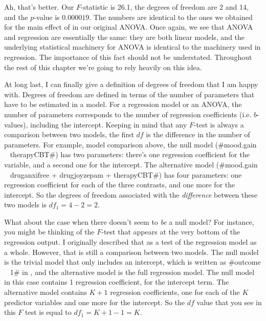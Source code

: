 Ah, that's better. Our $F$-statistic is 26.1, the degrees of freedom are 2 and 14, and the $p$-value is $0.000019$. The numbers are identical to the ones we obtained for the main effect of  in our original ANOVA. Once again, we see that ANOVA and regression are essentially the same: they are both linear models, and the underlying statistical machinery for ANOVA is identical to the machinery used in regression. The importance of this fact should not be understated. Throughout the rest of this chapter we're going to rely heavily on this idea.  



At long last, I can finally give a definition of degrees of freedom that I am happy with. Degrees of freedom are defined in terms of the number of parameters that have to be estimated in a model. For a regression model or an ANOVA, the number of parameters corresponds to the number of regression coefficients (i.e. $b$-values), including the intercept. Keeping in mind that any $F$-test is always a comparison between two models, the first $df$ is the difference in the number of parameters. For example, model comparison above, the null model (\rtextverb#mood.gain ~ therapyCBT#) has two parameters: there's one regression coefficient for the  variable, and a second one for the intercept. The  alternative model (\rtextverb#mood.gain ~ druganxifree + drugjoyzepam + therapyCBT#) has four parameters: one regression coefficient for each of the three contrasts, and one more for the intercept. So the degrees of freedom associated with the {\it difference} between these two models is $df_1 = 4-2 = 2$. 

What about the case when there doesn't seem to {\it be} a null model? For instance, you might be thinking of the $F$-test that appears at the very bottom of the regression output. I originally described that as a test of the regression model as a whole. However, that is still a comparison between two models. The null model is the trivial model that only includes an intercept, which is written as \rtextverb#outcome ~ 1# in \R, and the alternative model is the full regression model. The null model in this case contains 1 regression coefficient, for the intercept term. The alternative model contains $K+1$ regression coefficients, one for each of the $K$ predictor variables and one more for the intercept. So the $df$ value that you see in this $F$ test is equal to $df_1 = K+1-1 = K$.

